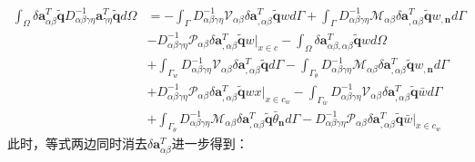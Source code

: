 \begin{equation}
\begin{split}
    \int_{\Omega}\delta\pmb{a}_{\alpha\beta}^T\tilde{\pmb{q}}D^{-1}_{\alpha\beta\gamma\eta}\pmb{a}_{\gamma\eta}^T\tilde{\pmb{q}}d\Omega&=
    -\int_{\Gamma}D_{\alpha\beta\gamma\eta}^{-1}\mathcal{V}_{\alpha\beta}\delta\pmb{a}_{,\alpha\beta}^T\tilde{\pmb{q}}wd\Gamma
    +\int_{\Gamma}D_{\alpha\beta\gamma\eta}^{-1}\mathcal{M}_{\alpha\beta}\delta\pmb{a}_{,\alpha\beta}^T\tilde{\pmb{q}}w_{,\pmb{n}}d\Gamma\\
    &-D_{\alpha\beta\gamma\eta}^{-1}\mathcal{P}_{\alpha\beta}\delta\pmb{a}_{,\alpha\beta}^T\tilde{\pmb{q}}w\vert_{x\in c}
    -\int_{\Omega}\delta\pmb{a}_{\alpha\beta,\alpha\beta}^T\tilde{\pmb{q}}wd\Omega\\
    &+\int_{\Gamma_w}D_{\alpha\beta\gamma\eta}^{-1}\mathcal{V}_{\alpha\beta}\delta\pmb{a}_{,\alpha\beta}^T\tilde{\pmb{q}}d\Gamma
    -\int_{\Gamma_{\theta}}D_{\alpha\beta\gamma\eta}^{-1}\mathcal{M}_{\alpha\beta}\delta\pmb{a}_{,\alpha\beta}^T\tilde{\pmb{q}}w_{,\pmb{n}}d\Gamma\\
    &+D_{\alpha\beta\gamma\eta}^{-1}\mathcal{P}_{\alpha\beta}\delta\pmb{a}_{,\alpha\beta}^T\tilde{\pmb{q}}wx\vert_{x\in{c_w}}
    -\int_{\Gamma_w}D_{\alpha\beta\gamma\eta}^{-1}\mathcal{V}_{\alpha\beta}\delta\pmb{a}_{,\alpha\beta}^T\tilde{\pmb{q}}\bar{w}d\Gamma\\
    &+\int_{\Gamma_{\theta}}D_{\alpha\beta\gamma\eta}^{-1}\mathcal{M}_{\alpha\beta}\delta\pmb{a}_{,\alpha\beta}^T\tilde{\pmb{q}}\bar{\theta}_{\pmb{n}}d\Gamma
    -D_{\alpha\beta\gamma\eta}^{-1}\mathcal{P}_{\alpha\beta}\delta\pmb{a}_{,\alpha\beta}^T\tilde{\pmb{q}}\bar{w}\vert_{x\in{c_w}}
\end{split}
\end{equation}
此时，等式两边同时消去$\delta\pmb{a}^T_{\alpha\beta}$进一步得到：
